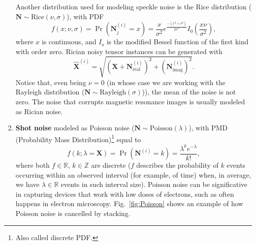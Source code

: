 \documentclass{article}
\begin{document}
\begin{enumerate}
  Another distribution used for modeling speckle noise is the Rice
  distribution ($\mathbf{N}\sim\mathrm{Rice}(\nu,\sigma)$), with PDF
  \begin{equation}
    f(x; \nu,\sigma) = \Pr({\mathbf N}^{(i)}_j{=}x) = \frac{x}{\sigma^2}e^{\frac{-(x^2+\nu^2)}{2\sigma^2}}I_0\left(\frac{x\nu}{\sigma^2}\right),
  \end{equation}
  where $x$ is continuous, and $I_o$ is the modified Bessel function
  of the first kind with order zero. Rician noisy tensor instances can
  be generated with
  \begin{equation}
    \hat{\mathbf X}^{(i)} = \sqrt{ ({\mathbf X} + {\mathbf N}_{\text{real}}^{(i)})^2 + ({\mathbf N}_{\text{imag}}^{(i)})^2}.
  \end{equation}
  Notice that, even being $\nu=0$ (in whose case we are working with
  the Rayleigh distribution
  ($\mathbf{N}\sim\mathrm{Rayleigh}(\sigma)$)), the mean of the noise
  is not zero. The noise that corrupts magnetic resonance images is
  usually modeled as Rician noise.
  
\item \textbf{Shot noise} modeled as Poisson noise
  ($\mathbf{N}\sim\mathrm{Poisson}(\lambda)$), with PMD (Probability Mass
  Distribution)\footnote{Also called discrete PDF.} equal to
  \begin{equation}
    f(k; \lambda={\mathbf X}) = \Pr({\mathbf N}^{(i)}{=}k) = \frac{\lambda^k e^{-\lambda}}{k!},
    \label{eq:PN}
  \end{equation}
  where both $f\in\mathbb{R}$, $k\in\mathbb{Z}$ are discrete ($f$
  describes the probability of $k$ events occurring within an observed
  interval (for example, of time) when, in average, we have
  $\lambda\in\mathbb{R}$ events in such interval size). Poisson noise
  can be significative in capturing devices that work with low doses
  of electrons, such as often happens in electron microscopy.
 Fig.~\ref{fig:Poisson} shows an example of
  how Poisson noise is cancelled by stacking.


\end{enumerate}
\end{document}
